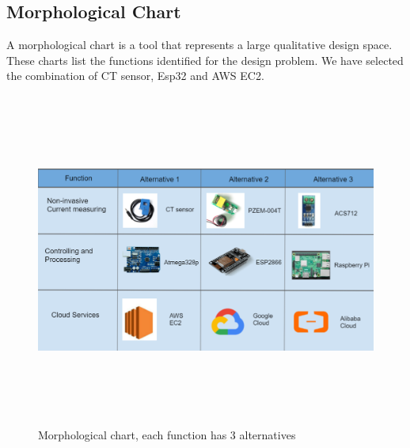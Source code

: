 \documentclass[12 pt]{report}
\begin{document}
\subsection{Morphological Chart}
A morphological chart is a tool that represents a large qualitative design space. These charts list the functions identified for the design problem. We have selected the combination of CT sensor, Esp32 and AWS EC2.
 \begin{figure}[h!]
\centering
\includegraphics[width=18cm,height = 11cm,frame]{images/morph.png}
\caption{Morphological chart, each function has 3 alternatives}
\label{fig:Morphological chart}
\end{figure}

 \newpage
 
\end{document}
